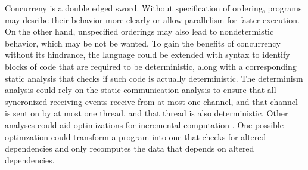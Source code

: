 \documentclass[letterpaper, 11pt]{extarticle}
\begin{document}
Concurreny is a double edged sword. Without specification of ordering, programs may
desribe their behavior more clearly or allow parallelism for faster execution. On the other hand,
unspecified orderings may also lead to nondetermistic behavior, which may be not be wanted. 
To gain the benefits of concurrency without its hindrance, the language could be extended
with syntax to identify blocks of code that are required to be deterministic,
along with a corresponding static analysis that checks if such code is actually
deterministic. The determinism analysis could rely on the static communication analysis
to ensure that all syncronized receiving events receive from at most one channel,
and that channel is sent on by at most one thread, and that thread is also deterministic.
Other analyses could aid optimizations for incremental computation
\cite{acar2002adaptive}. One possible optimzation could transform a program into one
that checks for altered dependencies and only recomputes the data that depends on altered dependencies.

\newpage



\end{document}
